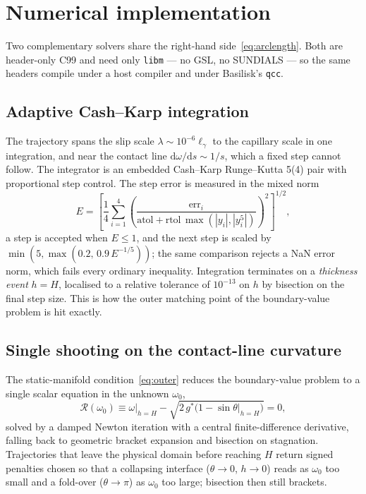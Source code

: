 \documentclass[11pt,a4paper]{article}
\newcommand{\lgamma}{\ell_\gamma}
\newcommand{\dd}{\mathrm{d}}
\begin{document}
\section{Numerical implementation}
\label{sec:numerics}

Two complementary solvers share the right-hand side~\eqref{eq:arclength}. Both
are header-only C99 and need only \texttt{libm} --- no GSL, no SUNDIALS ---
so the same headers compile under a host compiler and under Basilisk's
\texttt{qcc}.

\subsection{Adaptive Cash--Karp integration}

The trajectory spans the slip scale $\lambda \sim 10^{-6}\lgamma$ to the
capillary scale in one integration, and near the contact line
$\dd\omega/\dd s \sim 1/s$, which a fixed step cannot follow. The integrator is
an embedded Cash--Karp Runge--Kutta 5(4) pair with proportional step control.
The step error is measured in the mixed norm
\begin{equation}
  E = \left[\frac{1}{4}\sum_{i=1}^{4}
    \left(\frac{\mathrm{err}_i}{\mathrm{atol} + \mathrm{rtol}\,
      \max(|y_i|,|y_i^{5}|)}\right)^{2}\right]^{1/2},
\end{equation}
a step is accepted when $E \le 1$, and the next step is scaled by
$\min(5,\max(0.2,\,0.9\,E^{-1/5}))$; the same comparison rejects a NaN error
norm, which fails every ordinary inequality. Integration terminates on a
\emph{thickness event} $h = H$, localised to a relative tolerance of
$10^{-13}$ on $h$ by bisection on the final step size. This is how the outer
matching point of the boundary-value problem is hit exactly.

\subsection{Single shooting on the contact-line curvature}

The static-manifold condition~\eqref{eq:outer} reduces the boundary-value
problem to a single scalar equation in the unknown $\omega_0$,
\begin{equation}
  \mathcal{R}(\omega_0) \equiv \omega\big|_{h=H}
    - \sqrt{2\,g^{*}\bigl(1 - \sin\theta\big|_{h=H}\bigr)} = 0,
  \label{eq:residual}
\end{equation}
solved by a damped Newton iteration with a central finite-difference
derivative, falling back to geometric bracket expansion and bisection on
stagnation. Trajectories that leave the physical domain before reaching $H$
return signed penalties chosen so that a collapsing interface
($\theta \to 0$, $h \to 0$) reads as $\omega_0$ too small and a fold-over
($\theta \to \pi$) as $\omega_0$ too large; bisection then still brackets.
\end{document}

